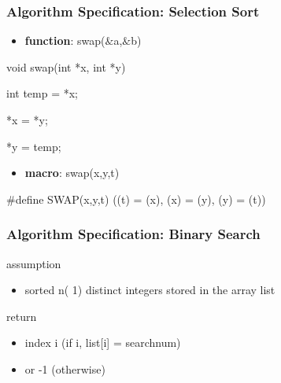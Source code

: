 \documentclass[newPxFont,sthlmFooter,nooffset]{beamer}
\begin{document}
\begin{frame}[t,fragile]
\frametitle{Algorithm Specification: Selection Sort}
\begin{itemize}
\item\textbf{function}: swap($\&$a,$\&$b)
\end{itemize}
\begin{codedef}
void swap(int *x, int *y){
	int temp = *x;
	
	*x = *y;
		
	*y = temp;
}
\end{codedef}
\begin{itemize}
\item\textbf{macro}: swap(x,y,t)
\end{itemize}
\begin{codedef}
#define SWAP(x,y,t) ((t) = (x), (x) = (y), (y) = (t))
\end{codedef}
\end{frame}

\begin{frame}[t]
  \frametitle{Algorithm Specification: Binary Search}
assumption
\begin{itemize}
\item sorted n( 1) distinct integers stored in the array list
\end{itemize}

return 
\begin{itemize}
\item index i (if i, list[i] = searchnum)
\item or -1 (otherwise)
\end{itemize}

\end{frame}
\end{document}

